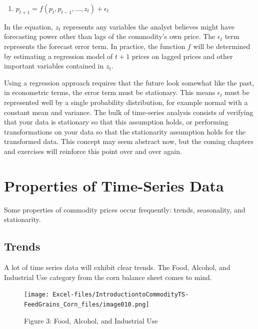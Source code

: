 \documentclass[
]{book}
\providecommand{\tightlist}{%
  \setlength{\itemsep}{0pt}\setlength{\parskip}{0pt}}
\begin{document}
\begin{enumerate}
\def\labelenumi{(\arabic{enumi})}
\tightlist
\item
  \(p_{t+1} = f(p_t, p_{t-1}, ..., z_t) + \epsilon_t\)
\end{enumerate}

In the equation, \(z_t\) represents any variables the analyst believes might have forecasting power other than lags of the commodity's own price. The \(\epsilon_t\) term represents the forecast error term. In practice, the function \(f\) will be determined by estimating a regression model of \(t+1\) prices on lagged prices and other important variables contained in \(z_t\).

Using a regression approach requires that the future look somewhat like the past, in econometric terms, the error term must be stationary. This means \(\epsilon_t\) must be represented well by a single probability distribution, for example normal with a constant mean and variance. The bulk of time-series analysis consists of verifying that your data is stationary so that this assumption holds, or performing transformations on your data so that the stationarity assumption holds for the transformed data. This concept may seem abstract now, but the coming chapters and exercises will reinforce this point over and over again.

\hypertarget{properties-of-time-series-data}{%
\section{Properties of Time-Series Data}\label{properties-of-time-series-data}}

Some properties of commodity prices occur frequently: trends, seasonality, and stationarity.

\hypertarget{trends}{%
\subsection{Trends}\label{trends}}

A lot of time series data will exhibit clear trends. The Food, Alcohol, and Industrial Use category from the corn balance sheet comes to mind.

\begin{figure}
\centering
\texttt{[image: Excel-files/IntroductiontoCommodityTS-FeedGrains\_Corn\_files/image010.png]}
\caption{Figure 3: Food, Alcohol, and Industrial Use}
\end{figure}
\end{document}
